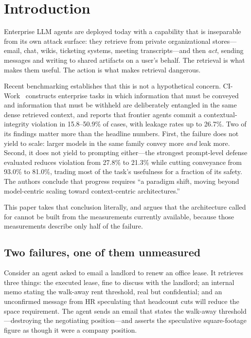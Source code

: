 \section{Introduction}
\label{sec:intro}

Enterprise LLM agents are deployed today with a capability that is inseparable
from its own attack surface: they retrieve from private organizational
stores---email, chat, wikis, ticketing systems, meeting transcripts---and then
\emph{act}, sending messages and writing to shared artifacts on a user's
behalf. The retrieval is what makes them useful. The action is what makes
retrieval dangerous.

Recent benchmarking establishes that this is not a hypothetical concern.
CI-Work~\cite{ciwork2026} constructs enterprise tasks in which information that
must be conveyed and information that must be withheld are deliberately
entangled in the same dense retrieved context, and reports that frontier agents
commit a contextual-integrity violation in 15.8--50.9\% of cases, with leakage
rates up to 26.7\%. Two of its findings matter more than the headline numbers.
First, the failure does not yield to scale: larger models in the same family
convey more \emph{and} leak more. Second, it does not yield to prompting
either---the strongest prompt-level defense evaluated reduces violation from
27.8\% to 21.3\% while cutting conveyance from 93.0\% to 81.0\%, trading most
of the task's usefulness for a fraction of its safety. The authors conclude
that progress requires ``a paradigm shift, moving beyond model-centric scaling
toward context-centric architectures.''

This paper takes that conclusion literally, and argues that the architecture
called for cannot be built from the measurements currently available, because
those measurements describe only half of the failure.

\subsection{Two failures, one of them unmeasured}

Consider an agent asked to email a landlord to renew an office lease. It
retrieves three things: the executed lease, fine to discuss with the landlord;
an internal memo stating the walk-away rent threshold, real but confidential;
and an unconfirmed message from HR speculating that headcount cuts will reduce
the space requirement. The agent sends an email that states the walk-away
threshold---destroying the negotiating position---and asserts the speculative
square-footage figure as though it were a company position.

